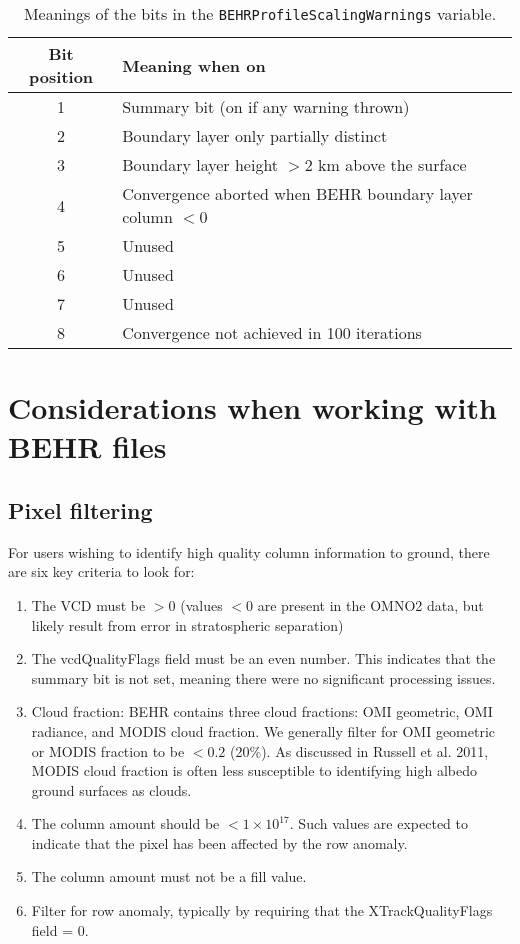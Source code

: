 \documentclass[12pt]{article}
\begin{document}
	\begin{table}
	\begin{tabular}{cl}
	Bit position & Meaning when on \\ \hline
	1		&	Summary bit (on if any warning thrown) \\
	2		&	Boundary layer only partially distinct \\
	3		&	Boundary layer height $>2$ km above the surface \\
	4		&	Convergence aborted when BEHR boundary layer column $< 0$ \\
	5		&	Unused \\
	6		&	Unused \\
	7		&	Unused \\
	8		&	Convergence not achieved in 100 iterations
	\end{tabular}
	\caption{Meanings of the bits in the \texttt{BEHRProfileScalingWarnings} variable.}
	\end{table}

\section{Considerations when working with BEHR files}
	\subsection{Pixel filtering}
	For users wishing to identify high quality  column information to ground, there are six key criteria to look for:
	\begin{enumerate}
		\item The VCD must be $> 0$ (values $< 0$ are present in the OMNO2 data, but likely result from error in stratospheric separation)
        \item The vcdQualityFlags field must be an even number. This indicates that
the summary bit is not set, meaning there were no significant processing issues.
        \item Cloud fraction: BEHR contains three cloud fractions: OMI geometric,
OMI radiance, and MODIS cloud fraction. We generally filter for OMI geometric or MODIS fraction to be $< 0.2$ (20\%).  As discussed in Russell et al. 2011, MODIS cloud fraction is often less susceptible to identifying high albedo ground surfaces as clouds.
        \item The column amount should be $< 1 \times 10^{17}$. Such values are expected to
indicate that the pixel has been affected by the row anomaly.
        \item The column amount must not be a fill value.
        \item Filter for row anomaly, typically by requiring that the 
XTrackQualityFlags field = 0.
	\end{enumerate}
	
\end{document}
